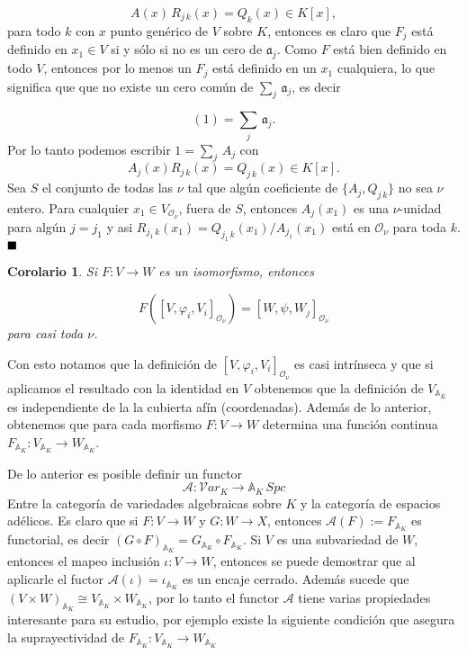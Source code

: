 \documentclass[letterpaper]{report}
\newtheorem{cor}[teorema]{Corolario}
\newcommand{\Oan}{\ensuremath{\mathcal{O}}}
\newcommand{\Ad}{\ensuremath{\mathbb{A}}}
\newcommand{\qed}{\ensuremath{\hspace*{0em plus 1fill}\blacksquare}}
\begin{document}
$$A(x)\,R_{j\,k}(x)=Q_{k}(x)\in K[x],$$
\noindent para todo $k$ con $x$ punto genérico de $V$ sobre $K$, entonces es claro que $F_j$ está definido en $x_1\in V$ si y sólo si no es un cero de $\mathfrak{a}_j$. Como $F$ está bien definido en todo $V$, entonces por lo menos un $F_j$ está definido en un $x_1$ cualquiera, lo que significa que que no existe un cero común de $\sum_j\,\mathfrak{a}_j$, es decir

$$(1)=\sum_j\,\mathfrak{a}_j.$$
\noindent Por lo tanto podemos escribir $1=\sum_j\,A_j$ con 
$$A_j(x)R_{j\,k}(x)=Q_{j\,k}(x)\in K[x].$$
\noindent Sea $S$ el conjunto de todas las $\nu$ tal que algún coeficiente de $\lbrace A_j,Q_{j\,k}\rbrace$ no sea $\nu$ entero. Para cualquier $x_1\in V_{\Oan_{\nu}}$,  fuera de $S$, entonces $A_j(x_1)$ es una $\nu$-unidad para algún $j=j_1$ y asi $R_{j_1\,k}(x_1)=Q_{j_1\,k}(x_1)/A_{j_1}(x_1)$ está en $\Oan_{\nu}$ para toda $k$.\qed 
\begin{cor}
Si $F:V\rightarrow W$ es un isomorfismo, entonces 

$$F([V,\varphi_i,V_i]_{\Oan_{\nu}})=[W,\psi,W_j]_{\Oan_{\nu}}$$
\noindent para casi toda $\nu$.
\end{cor}

Con esto notamos que la definición de $[V,\varphi_i,V_i]_{\Oan_{\nu}}$ es casi intrínseca y que si aplicamos el resultado con la identidad en $V$ obtenemos que la definición de $V_{\Ad_{K}}$ es independiente de la la cubierta afín (coordenadas). Además de lo anterior, obtenemos que para cada morfismo $F:V\rightarrow W$ determina una función continua \hbox{$F_{\Ad_{K}}:V_{\Ad_{K}}\rightarrow W_{\Ad_{K}}$}.   

De lo anterior es posible definir un functor 
\begin{equation}
	\mathcal{A}:{\mathcal{V}ar}_K\rightarrow\Ad_{K}\,Spc
\end{equation}
Entre la categoría de variedades algebraicas sobre $K$ y la categoría de espacios adélicos. Es claro que si $F:V\rightarrow W$ y $G:W\rightarrow X$, entonces $\mathcal{A}(F):=F_{\Ad_{K}}$ es functorial, es decir \hbox{$(G\circ F)_{\Ad_{K}}=G_{\Ad_{K}}\circ F_{\Ad_{K}}$}. Si $V$ es una subvariedad de $W$, entonces el mapeo inclusión $\iota:V\rightarrow W$, entonces se puede demostrar que al aplicarle el fuctor $\mathcal{A}(\iota)=\iota_{\Ad_{K}}$ es un encaje cerrado. Además sucede que \hbox{$(V\times W)_{\Ad_{K}}\cong V_{\Ad_{K}}\times W_{\Ad_{K}}$}, por lo tanto el functor $\mathcal{A}$ tiene varias propiedades interesante para su estudio, por ejemplo  existe la siguiente condición que asegura la suprayectividad de \hbox{$F_{\Ad_{K}}:V_{\Ad_{K}}\rightarrow W_{\Ad_{K}}$}
\end{document}
